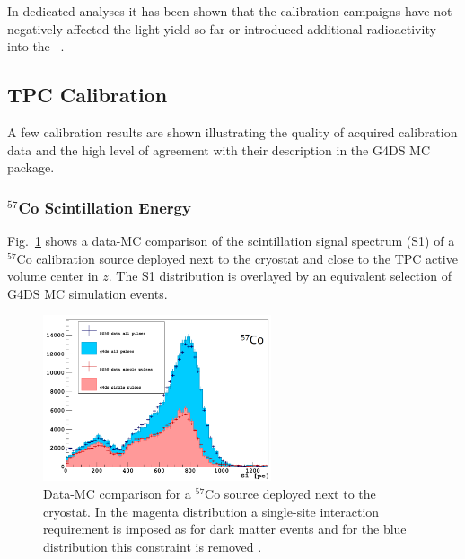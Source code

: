 In dedicated analyses it has been shown that the calibration campaigns have not negatively affected the light yield so far or introduced additional radioactivity into the \lsv\ \cite{Agnes:2015qyz}.



\subsection{TPC Calibration}
A few calibration results are shown illustrating the quality of acquired calibration data and the high level of agreement with their description in the G4DS MC package.

\subsubsection{$^{57}$Co Scintillation Energy}
Fig.~\ref{fig:CalibData:Co57} shows a data-MC comparison of the scintillation signal spectrum (S1) of a $^{57}$Co calibration source deployed next to the cryostat and close to the TPC active volume center in $z$. The S1 distribution is overlayed by an equivalent selection of G4DS MC simulation events.

\begin{figure}[htbp]
\centering
\includegraphics[width=0.6\textwidth]{./Figures/57Co_Paolo_G4DS_UCLA.png}
\caption{Data-MC comparison for a $^{57}$Co source deployed next to the cryostat. In the magenta distribution a single-site interaction requirement is imposed as for dark matter events and for the blue distribution this constraint is removed \cite{DS50:G4DS:paper}.
\label{fig:CalibData:Co57}}
 \end{figure}


